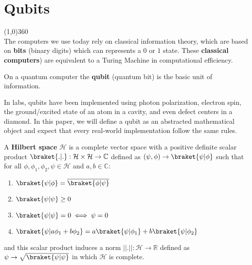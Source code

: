 \chapter{Qubits}

\line(1,0){360} \\

The computers we use today rely on classical information theory, which are based on \textbf{bits} (binary digits) which can represents a $0$ or $1$ state. These \textbf{classical computers}) are equivalent to a Turing Machine in computational efficiency. 

On a quantum computer the \textbf{qubit} (quantum bit) is the basic unit of information.

In labs, qubits have been implemented using photon polarization, electron spin, the ground/excited state of an atom in a cavity, and even defect centers in a diamond. In this paper, we will define a qubit as an abstracted mathematical object and expect that every real-world implementation follow the same rules.

\begin{defn}
    A \textbf{Hilbert space} $\mathcal{H}$ is a complete vector space with a positive definite scalar product $\braket{.|.} : \mathcal{H} \times \mathcal{H} \to \mathbb{C}$ defined as $(\psi,\phi) \to \braket{\psi|\phi}$ such that for all $\phi, \phi_1, \phi_2, \psi \in \mathcal{H}$ and $a, b \in \mathbb{C}$:
    \begin{enumerate}
        \item $\braket{\psi | \phi} = \overline{\braket{\phi | \psi}}$
        \item $\braket{\psi | \psi} \geq 0$
        \item $\braket{\psi | \psi} = 0 \iff \psi = 0$
        \item $\braket{\psi | a \phi_1 + b \phi_2} = a \braket{\psi | \phi_1} + b \braket{\psi | \phi_2}$
    \end{enumerate}
    and this scalar product induces a norm $||.|| : \mathcal{H} \to \mathbb{R}$ defined as $\psi \to \sqrt{\braket{\psi|\psi}}$ in which $\mathcal{H}$ is complete.
\end{defn}

